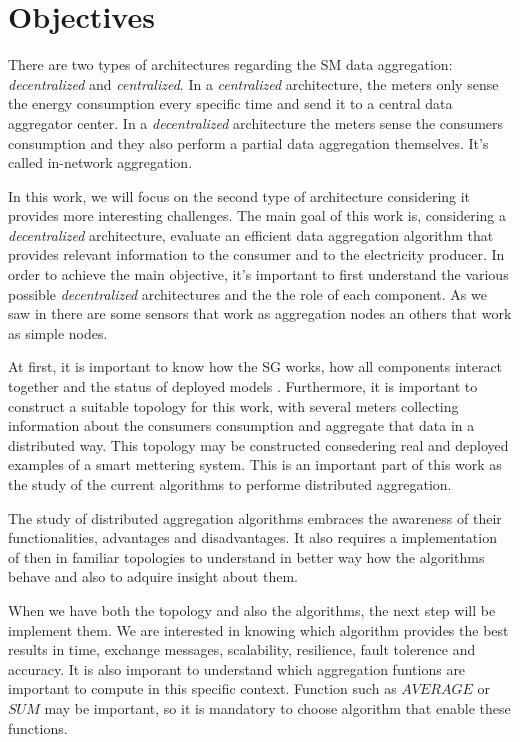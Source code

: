 \section{Objectives}
There are two types of architectures\cite{journals/spm/ErkinTLP13} regarding the SM data aggregation:  \textit{decentralized} and \textit{centralized}. In a \textit{centralized} architecture, the meters only sense the energy consumption every specific time and send it to a central data aggregator center. In a \textit{decentralized} architecture the meters sense the consumers consumption and they also perform a partial data aggregation themselves. It's called in-network aggregation\cite{journals/spm/ErkinTLP13}.

In this work, we will focus on the second type of architecture considering it provides more interesting challenges. The main goal of this work is, considering a \textit{decentralized} architecture, evaluate an efficient data aggregation algorithm that provides relevant information to the consumer and to the electricity producer. 
In order to achieve the main objective, it's important to first understand the various possible \textit{decentralized} architectures and the the role of each component. As  we saw in \cite{Girao2004c} there are some sensors that work as aggregation nodes an others that work as simple nodes. 

At first, it is important to know how the SG works, how all components interact together and the status of deployed models . Furthermore, it is important to construct a suitable topology for this work, with several meters collecting information about the consumers consumption and aggregate that data in a distributed way. This topology may be constructed consedering real and deployed examples of a smart mettering system. This is an important part of this work as the study of the current algorithms to performe distributed aggregation.

The study of distributed aggregation algorithms embraces the awareness of their functionalities, advantages and disadvantages. It also requires a implementation of then in familiar topologies to understand in better way how the algorithms behave and also to adquire insight about them. 

When we have both the topology and also the algorithms, the next step will be implement them. We are interested in knowing which algorithm provides the best results in time, exchange messages, scalability, resilience, fault tolerence and accuracy. It is also imporant to understand which aggregation funtions are important to compute in this specific context. Function such as $AVERAGE$ or $SUM$ may be important, so it is mandatory to choose algorithm that enable these functions.

